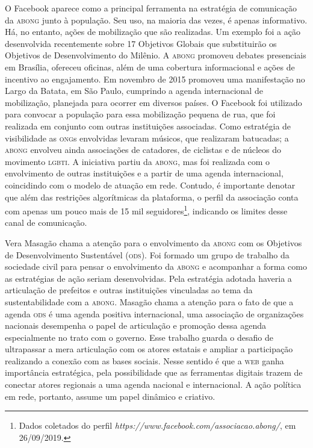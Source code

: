 O Facebook aparece como a principal ferramenta na estratégia de
comunicação da \textsc{abong} junto à população. Seu uso, na maioria das vezes, é
apenas informativo. Há, no entanto, ações de mobilização que são
realizadas. Um exemplo foi a ação desenvolvida recentemente sobre 17
Objetivos Globais que substituirão os Objetivos de Desenvolvimento do
Milênio. A \textsc{abong} promoveu debates presenciais em Brasília, ofereceu
oficinas, além de uma cobertura informacional e ações de incentivo ao
engajamento. Em novembro de 2015 promoveu uma manifestação no Largo da
Batata, em São Paulo, cumprindo a agenda internacional de mobilização,
planejada para ocorrer em diversos países. O Facebook foi utilizado para
convocar a população para essa mobilização pequena de rua, que foi
realizada em conjunto com outras instituições associadas. Como
estratégia de visibilidade as \textsc{ong}s envolvidas levaram músicos, que
realizaram batucadas; a \textsc{abong} envolveu ainda associações de catadores,
de ciclistas e de núcleos do movimento \textsc{lgbti}. A iniciativa partiu da
\textsc{abong}, mas foi realizada com o envolvimento de outras instituições e a
partir de uma agenda internacional, coincidindo com o modelo de atuação
em rede. Contudo, é importante denotar que além das restrições
algorítmicas da plataforma, o perfil da associação conta com apenas um
pouco mais de 15 mil seguidores\footnote{Dados coletados do perfil
  \emph{https://www.facebook.com/associacao.abong/},
  em 26/09/2019.}, indicando os limites desse canal de comunicação.

Vera Masagão chama a atenção para o envolvimento da \textsc{abong} com os
Objetivos de Desenvolvimento Sustentável (\textsc{ods}). Foi formado um grupo de
trabalho da sociedade civil para pensar o envolvimento da \textsc{abong} e
acompanhar a forma como as estratégias de ação seriam desenvolvidas.
Pela estratégia adotada haveria a articulação de prefeitos e outras
instituições vinculadas ao tema da sustentabilidade com a \textsc{abong}. Masagão
chama a atenção para o fato de que a agenda \textsc{ods} é uma agenda positiva
internacional, uma associação de organizações nacionais desempenha o
papel de articulação e promoção dessa agenda especialmente no trato com
o governo. Esse trabalho guarda o desafio de ultrapassar a mera
articulação com os atores estatais e ampliar a participação realizando a
conexão com as bases sociais. Nesse sentido é que a \textsc{web} ganha
importância estratégica, pela possibilidade que as ferramentas digitais
trazem de conectar atores regionais a uma agenda nacional e
internacional. A ação política em rede, portanto, assume um papel
dinâmico e criativo.

